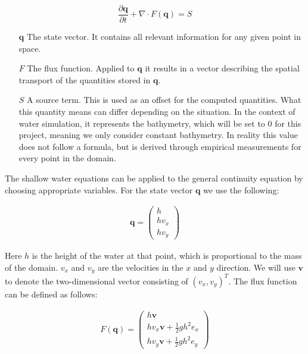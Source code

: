 \documentclass[a4paper, twoside]{article}
\newcommand{\pd}[2]{\dfrac{\partial #1}{\partial #2}}
\begin{document}
\begin{equation}
  \label{eq:general-continuity-equation}
  \pd{\mathbf{q}}{t} + \nabla \cdot F(\mathbf{q}) = S
\end{equation}

\begin{itemize}
\item[$\mathbf{q}$] The state vector. It contains all relevant information for any given point in space.
\item[$F$] The flux function. Applied to $\mathbf{q}$ it results in a vector describing the spatial transport of the quantities stored in $\mathbf{q}$.
\item[$S$] A source term. This is used as an offset for the computed quantities. What this quantity means can differ depending on the situation. In the context of water simulation, it represents the bathymetry, which will be set to 0 for this project, meaning we only consider constant bathymetry. In reality this value does not follow a formula, but is derived through empirical measurements for every point in the domain.
\end{itemize}

The shallow water equations can be applied to the general continuity equation by choosing appropriate variables. For the state vector $\mathbf{q}$ we use the following:

\begin{eqnarray*}
  \mathbf{q} =
  \begin{pmatrix}
    h \\ h v_x \\ h v_y
  \end{pmatrix}
\end{eqnarray*}

Here $h$ is the height of the water at that point, which is proportional to the mass of the domain. $v_x$ and $v_y$ are the velocities in the $x$ and $y$ direction. We will use $\mathbf{v}$ to denote the two-dimensional vector consisting of $\left( v_x, v_y \right)^T$. The flux function can be defined as follows:

\begin{eqnarray*}
  F(\mathbf{q}) =
  \begin{pmatrix}
    h \mathbf{v} \\ h v_x \mathbf{v} + \frac{1}{2} g h^2 e_x \\ h v_y \mathbf{v} + \frac{1}{2} g h^2 e_y
  \end{pmatrix}
\end{eqnarray*}
\end{document}
